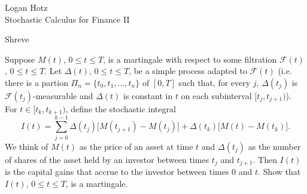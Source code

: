 \documentclass[11pt]{article}
\newcommand\cF{\mathcal{F}}
\newcounter{question}[section]
\newenvironment{hwheader}
    {
        \begin{flushright}
            \begin{tcolorbox}[
                width=0.55\textwidth,
                colback=tlightblue,
                colframe=tblue,
                opacityback=0.25,
                enhanced jigsaw
            ]
                \begin{flushright}
                    Logan Hotz \\
    }
    {
                \end{flushright}
            \end{tcolorbox}
        \end{flushright}
        \vspace{4mm}
    }
\begin{document}
    \begin{hwheader}
        Stochastic Calculus for Finance II

        Shreve
    \end{hwheader}





    \begin{hwquestion}
        Suppose $M(t)$, $0 \leq t \leq T$, is a martingale with respect to some filtration
        $\cF(t)$, $0 \leq t \leq T$. Let $\Delta(t)$, $0 \leq t \leq T$, be a simple process
        adapted to $\cF(t)$ (i.e. there is a partion $\Pi_n = \{ t_0, t_1, \dots, t_n \}$ of
        $[0, T]$ such that, for every $j$, $\Delta(t_j)$ is $\cF(t_j)$-measurable and
        $\Delta(t)$ is constant in $t$ on each subinterval $[t_{j}, t_{j+1})$). For $t \in
        [t_{k}, t_{k+1})$, define the stochastic integral
        \[
            I(t)
            =
            \sum_{j=0}^{k-1}
            \Delta(t_j) \big[ M(t_{j+1}) - M(t_{j}) \big]
            +
            \Delta(t_{k}) \big[ M(t) - M(t_{k}) \big].
        \]
        We think of $M(t)$ as the price of an asset at time $t$ and $\Delta(t_j)$ as the
        number of shares of the asset held by an investor between times $t_{j}$ and $t_{j
        +1}$. Then $I(t)$ is the capital gains that accrue to the investor between times
        $0$ and $t$. Show that $I(t)$, $0 \leq t \leq T$, is a martingale.
    \end{hwquestion}
\end{document}

